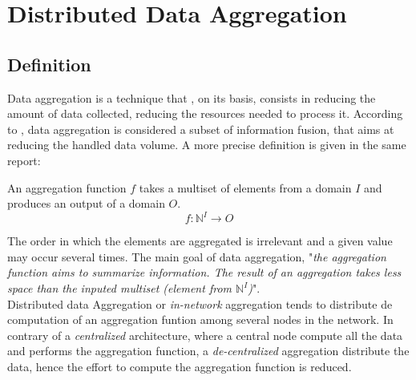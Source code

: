 \chapter{Distributed Data Aggregation}\label{chap:dda}
\section{Definition}
Data aggregation is a technique that , on its basis, consists in reducing the amount of data collected, reducing the resources needed to process it.  According to \cite{journals/corr/abs-1110-0725}, data aggregation is  considered a subset of information fusion, that aims at reducing the handled data volume. A more precise definition is given in the same report:
\begin{definition} An aggregation function $f$ takes a multiset of elements from a domain $I$ and produces an output of a domain $O$.
\begin{equation*} f : \mathbb{N}^I \to O \end{equation*}
\end{definition}
The order in which the elements are aggregated is irrelevant and a given value may occur several times.
The main goal of data aggregation, "\textit{the aggregation function aims to summarize information. The result of an aggregation takes less space than the inputed multiset (element from $\mathbb{N}^I$)}".\\
Distributed data Aggregation or \textit{in-network} aggregation tends to distribute de computation of an aggregation funtion among several nodes in the network. In contrary of a \textit{centralized} architecture, where a central node compute all the data and performs the aggregation function, a \textit{de-centralized} aggregation distribute the data, hence the effort to compute the aggregation function is reduced.


